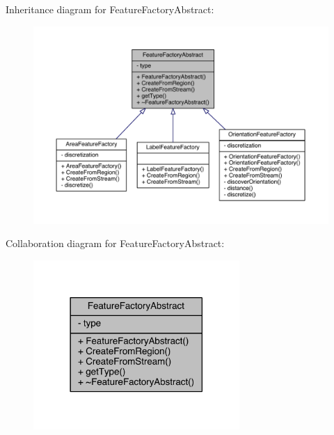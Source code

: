 Inheritance diagram for Feature\+Factory\+Abstract\+:
\nopagebreak
\begin{figure}[H]
\begin{center}
\leavevmode
\includegraphics[width=350pt]{class_feature_factory_abstract__inherit__graph}
\end{center}
\end{figure}


Collaboration diagram for Feature\+Factory\+Abstract\+:\nopagebreak
\begin{figure}[H]
\begin{center}
\leavevmode
\includegraphics[width=222pt]{class_feature_factory_abstract__coll__graph}
\end{center}
\end{figure}


